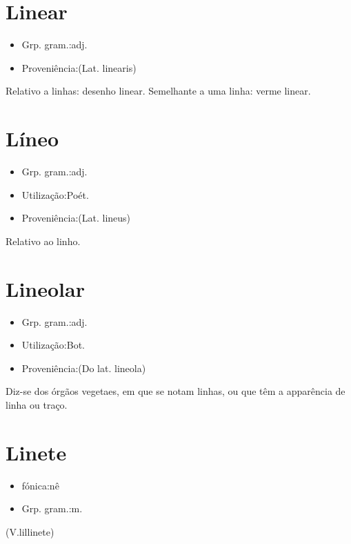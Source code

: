 \section{Linear}
\begin{itemize}
\item {Grp. gram.:adj.}
\end{itemize}
\begin{itemize}
\item {Proveniência:(Lat. \textunderscore linearis\textunderscore )}
\end{itemize}
Relativo a linhas: desenho linear.
Semelhante a uma linha: \textunderscore verme linear\textunderscore .
\section{Líneo}
\begin{itemize}
\item {Grp. gram.:adj.}
\end{itemize}
\begin{itemize}
\item {Utilização:Poét.}
\end{itemize}
\begin{itemize}
\item {Proveniência:(Lat. \textunderscore lineus\textunderscore )}
\end{itemize}
Relativo ao linho.
\section{Lineolar}
\begin{itemize}
\item {Grp. gram.:adj.}
\end{itemize}
\begin{itemize}
\item {Utilização:Bot.}
\end{itemize}
\begin{itemize}
\item {Proveniência:(Do lat. \textunderscore lineola\textunderscore )}
\end{itemize}
Diz-se dos órgãos vegetaes, em que se notam linhas, ou que têm a apparência de linha ou traço.
\section{Linete}
\begin{itemize}
\item {fónica:nê}
\end{itemize}
\begin{itemize}
\item {Grp. gram.:m.}
\end{itemize}
(V.lillinete)

